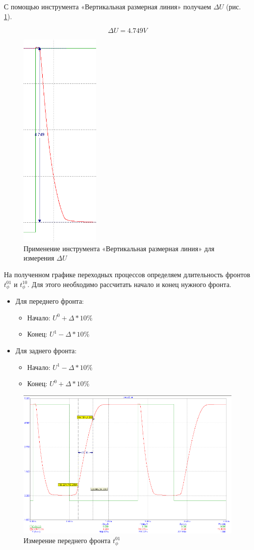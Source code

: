 \documentclass[a4paper,14pt]{article}
\begin{document}
С помощью инструмента «Вертикальная размерная линия» получаем $\Delta U$ (рис. \ref{fig:btgrafper1}).

$$\Delta U = 4.749 V$$

\begin{figure}[H]
	\centering
	\includegraphics[width=0.2\linewidth]{image/BT_graf_per1}
	\caption{Применение инструмента «Вертикальная размерная линия» для измерения $\Delta U$}
	\label{fig:btgrafper1}
\end{figure}

На полученном графике переходных процессов определяем длительность фронтов $t^{01}_\phi$ и $t^{10}_\phi$.
Для этого необходимо рассчитать начало и конец нужного фронта.

\begin{itemize}
	\item Для переднего фронта: 
	\begin{itemize}
		\item Начало: $U^0 + \Delta * 10\%$
		\item Конец:  $U^1 - \Delta * 10\%$
	\end{itemize}
	
	\item Для заднего фронта: 
	\begin{itemize}
		\item Начало: $U^1 - \Delta * 10\%$
		\item Конец:  $U^0 + \Delta * 10\%$
	\end{itemize}
\end{itemize}

\begin{figure}[H]
	\centering
	\includegraphics[width=0.7\linewidth]{image/BT_graf_t01}
	\caption{Измерение переднего фронта $t^{01}_\phi$}
	\label{fig:btgraft01}
\end{figure}
\end{document}
